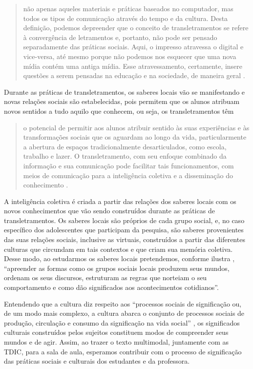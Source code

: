 \documentclass{textolivre}
\begin{document}
\begin{quote}
não apenas aqueles materiais e práticas baseados no computador, mas todos os tipos de comunicação através do tempo e da cultura. Desta definição, podemos depreender que o conceito de transletramentos se refere à convergência de letramentos e, portanto, não pode ser pensado separadamente das práticas sociais. Aqui, o impresso atravessa o digital e vice-versa, até mesmo porque não podemos nos esquecer que uma nova mídia contém uma antiga mídia. Esse atravessamento, certamente, insere questões a serem pensadas na educação e na sociedade, de maneira geral \cite[p.~218]{garcia2017}.
\end{quote}

Durante as práticas de transletramentos, os saberes locais vão se manifestando e novas relações sociais são estabelecidas, pois permitem que os alunos atribuam novos sentidos a tudo aquilo que conhecem, ou seja, os transletramentos têm

\begin{quote}
o potencial de permitir aos alunos atribuir sentido às suas experiências e às transformações sociais que os aguardam ao longo da vida, particularmente a abertura de espaços tradicionalmente desarticulados, como escola, trabalho e lazer. O transletramento, com seu enfoque combinado da informação e sua comunicação pode facilitar tais funcionamentos, com meios de comunicação para a inteligência coletiva e a disseminação do conhecimento \cite[p.~71]{frau-meigs2014}.
\end{quote}

A inteligência coletiva é criada a partir das relações dos saberes locais com os novos conhecimentos que vão sendo construídos durante as práticas de transletramentos. Os saberes locais são próprios de cada grupo social, e, no caso específico dos adolescentes que participam da pesquisa, são saberes provenientes das suas relações sociais, inclusive as virtuais, construídos a partir das diferentes culturas que circundam em tais contextos e que criam sua memória coletiva. Desse modo, ao estudarmos os saberes locais pretendemos, conforme ilustra \textcite[p. 27]{basilio2006}, “apreender as formas como os grupos sociais locais produzem seus mundos, ordenam os seus discursos, estruturam as regras que norteiam o seu comportamento e como dão significados aos acontecimentos cotidianos”.

Entendendo que a cultura diz respeito aos “processos sociais de significação ou, de um modo mais complexo, a cultura abarca o conjunto de processos sociais de produção, circulação e consumo da significação na vida social” \cite[p.~41]{canclini2009}, os significados culturais construídos pelos sujeitos constituem modos de compreender seus mundos e de agir. Assim, ao trazer o texto multimodal, juntamente com as TDIC, para a sala de aula, esperamos contribuir com o processo de significação das práticas sociais e culturais dos estudantes e da professora.
\end{document}

